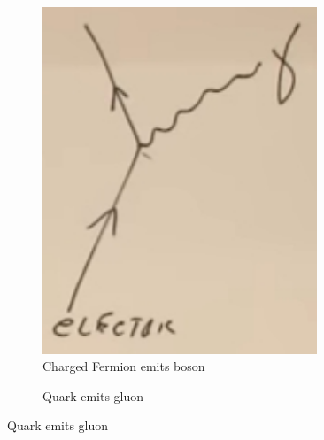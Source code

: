 \documentclass[]{article}
\begin{document}
\begin{figure}[H]
	\caption{Processes of the Standard Model (not exhaustive)}\label{fig:sm:processes}
	\begin{subfigure}[t]{0.3\textwidth}
		\caption{Charged Fermion emits boson}
		\includegraphics[width=0.9\textwidth]{2-a2-feynman1}
	\end{subfigure}
	\begin{subfigure}[t]{0.3\textwidth}
		\caption{Quark emits gluon}

\end{subfigure}
\end{figure}
\end{document}
